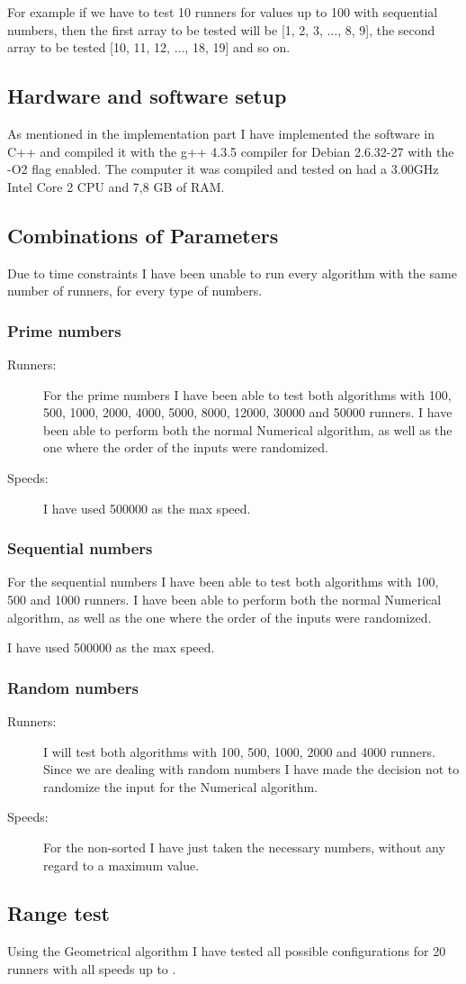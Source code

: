 For example if we have to test 10 runners for values up to 100 with sequential numbers, then the first array to be tested will be [1, 2, 3, $\ldots$, 8, 9], the second array to be tested [10, 11, 12, $\ldots$, 18, 19] and so on.

\subsection{Hardware and software setup}
As mentioned in the implementation part I have implemented the software in C++ and compiled it with the g++ 4.3.5 compiler for Debian 2.6.32-27 with the -O2 flag enabled. The computer it was compiled and tested on had a 3.00GHz Intel Core 2 CPU and 7,8 GB of RAM.

\subsection{Combinations of Parameters} 

Due to time constraints I have been unable to run every algorithm with the same number of runners, for every type of numbers.

\subsubsection{Prime numbers}
\begin{description}
\item[Runners:]For the prime numbers I have been able to test both algorithms with 100, 500, 1000, 2000, 4000, 5000, 8000, 12000, 30000 and 50000 runners. I have been able to perform both the normal Numerical algorithm, as well as the one where the order of the inputs were randomized.  
\item[Speeds:] I have used 500000 as the max speed.
\end{description}

\subsubsection{Sequential numbers}
\item[Runners:]For the sequential numbers I have been able to test both algorithms with 100, 500 and 1000 runners. I have been able to perform both the normal Numerical algorithm, as well as the one where the order of the inputs were randomized.  
\item[Speeds:] I have used 500000 as the max speed.

\subsubsection{Random numbers}
\begin{description}
\item[Runners:] I will test both algorithms with 100, 500, 1000, 2000 and 4000 runners. Since we are dealing with random numbers I have made the decision not to randomize the input for the Numerical algorithm.
\item[Speeds:] For the non-sorted I have just taken the necessary numbers, without any regard to a maximum value. 
\end{description}

\subsection{Range test}
Using the Geometrical algorithm I have tested all possible configurations for 20 runners with all speeds up to \maxNumbers.
